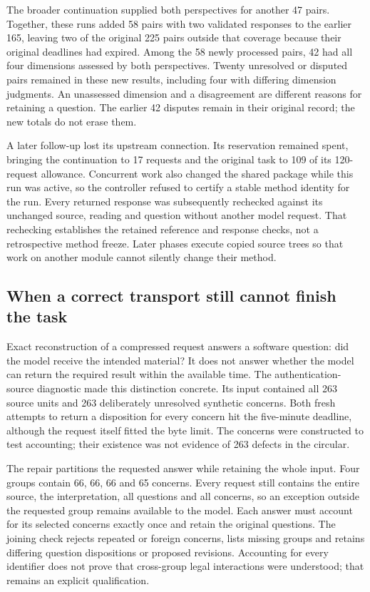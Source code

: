 The broader continuation supplied both perspectives for another 47 pairs.
Together, these runs added 58 pairs with two validated responses to the earlier
165, leaving two of the original 225 pairs outside that coverage because their
original deadlines had expired. Among the 58 newly processed pairs, 42 had all
four dimensions assessed by both perspectives. Twenty unresolved or disputed
pairs remained in these new results, including four with differing dimension
judgments. An unassessed dimension and a disagreement are different reasons
for retaining a question. The earlier 42 disputes remain in their original
record; the new totals do not erase them.

A later follow-up lost its upstream connection. Its reservation remained
spent, bringing the continuation to 17 requests and the original task to
109 of its 120-request allowance. Concurrent work also changed the shared
package while this run was active, so the controller refused to certify a
stable method identity for the run. Every returned response was subsequently
rechecked against its unchanged source, reading and question without another
model request. That rechecking establishes the retained reference and response
checks, not a retrospective method freeze. Later phases execute copied source
trees so that work on another module cannot silently change their method.

\subsection{When a correct transport still cannot finish the task}

Exact reconstruction of a compressed request answers a software question:
did the model receive the intended material? It does not answer whether the
model can return the required result within the available time. The
authentication-source diagnostic made this distinction concrete. Its input
contained all 263 source units and 263 deliberately unresolved synthetic
concerns. Both fresh attempts to return a disposition for every concern hit
the five-minute deadline, although the request itself fitted the byte limit.
The concerns were constructed to test accounting; their existence was not
evidence of 263 defects in the circular.

The repair partitions the requested answer while retaining the whole input.
Four groups contain 66, 66, 66 and 65 concerns. Every request still contains
the entire source, the interpretation, all questions and all concerns, so an
exception outside the requested group remains available to the model. Each
answer must account for its selected concerns exactly once and retain the
original questions. The joining check rejects repeated or foreign concerns,
lists missing groups and retains differing question dispositions or proposed
revisions. Accounting for every identifier does not prove that cross-group
legal interactions were understood; that remains an explicit qualification.

